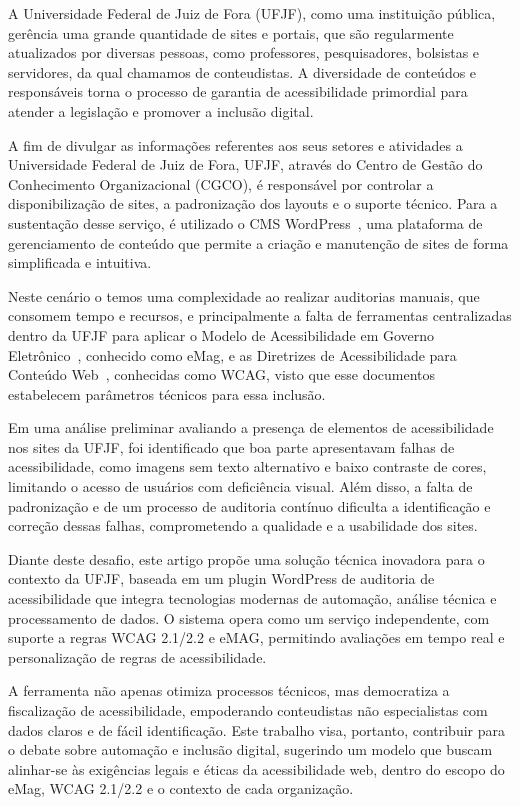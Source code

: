 \documentclass[12pt]{article}
\begin{document}
A Universidade Federal de Juiz de Fora (UFJF), como uma instituição pública,
gerência uma grande quantidade de sites e portais, que são regularmente
atualizados por diversas pessoas, como professores, pesquisadores, bolsistas e
servidores, da qual chamamos de conteudistas. A diversidade de conteúdos e
responsáveis torna o processo de garantia de acessibilidade primordial para
atender a legislação e promover a inclusão digital.

A fim de divulgar as informações referentes aos seus setores e atividades a
Universidade Federal de Juiz de Fora, UFJF, através do Centro de Gestão
do Conhecimento Organizacional (CGCO), é responsável por controlar a
disponibilização de sites, a padronização dos layouts e o suporte técnico. Para
a sustentação desse serviço, é utilizado o CMS WordPress~\autocite{WP},
uma plataforma de gerenciamento de conteúdo que permite a criação e
manutenção de sites de forma simplificada e intuitiva.

Neste cenário o temos uma complexidade ao realizar auditorias manuais, que
consomem tempo e recursos, e principalmente a falta de ferramentas
centralizadas dentro da UFJF para aplicar o Modelo de Acessibilidade em
Governo Eletrônico~\cite{emag}, conhecido como eMag, e as Diretrizes
de Acessibilidade para Conteúdo Web~\cite{wcag22}, conhecidas como
WCAG, visto que esse documentos estabelecem parâmetros técnicos para essa inclusão.

Em uma análise preliminar avaliando a presença de elementos de acessibilidade nos
sites da UFJF, foi identificado que boa parte apresentavam falhas de acessibilidade, como imagens sem texto
alternativo e baixo contraste de cores, limitando o acesso de usuários com deficiência
visual. Além disso, a falta de padronização e de um processo de auditoria contínuo
dificulta a identificação e correção dessas falhas, comprometendo a qualidade e a
usabilidade dos sites.

Diante deste desafio, este artigo propõe uma solução técnica inovadora
para o contexto da UFJF, baseada em um plugin WordPress de auditoria
de acessibilidade que integra tecnologias modernas de automação,
análise técnica e processamento de dados. O sistema opera como um serviço
independente, com suporte a regras WCAG 2.1/2.2 e eMAG, permitindo
avaliações em tempo real e personalização de regras de acessibilidade.

A ferramenta não apenas otimiza processos técnicos, mas democratiza
a fiscalização de acessibilidade, empoderando conteudistas não especialistas
com dados claros e de fácil identificação. Este trabalho visa, portanto, contribuir
para o debate sobre automação e inclusão digital, sugerindo um modelo que buscam alinhar-se às exigências legais e éticas da
acessibilidade web, dentro do escopo do eMag, WCAG 2.1/2.2 e o contexto de cada
organização.
\end{document}
